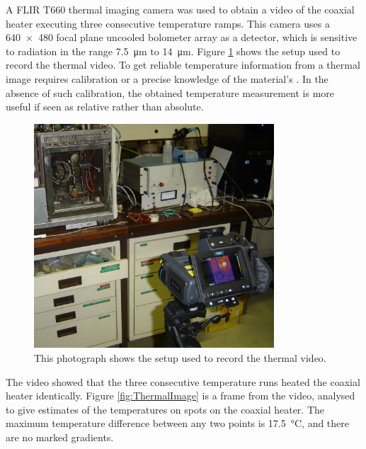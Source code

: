 A FLIR{\texttrademark} T660 thermal imaging camera was used to obtain a video of
the coaxial heater executing three consecutive temperature ramps. This camera
uses a \num{640 x 480} focal plane uncooled bolometer array as a detector, which
is sensitive to radiation in the range \SI{7.5}{\micro\metre} to
\SI{14}{\micro\metre}. Figure \ref{fig:ThermalImageSetup} shows the setup used
to record the thermal video. To get reliable temperature information from a
thermal image requires calibration or a precise knowledge of the material's
. In the absence of such calibration, the obtained
temperature measurement is more useful if seen as relative rather than absolute.

\begin{figure}
	\centering
	\includegraphics[width=0.8\textwidth]{Figures/ThermalImageSetup}
	\decoRule
	
\caption[A photograph of the setup used to record the thermal video]{This
photograph shows the setup used to record the thermal video.}
	
	\label{fig:ThermalImageSetup}
\end{figure}

The video showed that the three consecutive temperature runs heated the coaxial
heater identically. Figure \ref{fig:ThermalImage} is a frame from the video,
analysed to give estimates of the temperatures on spots on the coaxial heater.
The maximum temperature difference between any two points is
\SI{17.5}{\celsius}, and there are no marked gradients.

